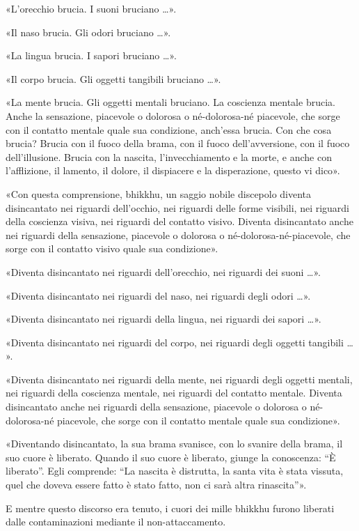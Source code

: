 «L’orecchio brucia. I suoni bruciano …​».


«Il naso brucia. Gli odori bruciano …​».


«La lingua brucia. I sapori bruciano …​».


«Il corpo brucia. Gli oggetti tangibili bruciano …​».


«La mente brucia. Gli oggetti mentali bruciano. La coscienza mentale
brucia. Anche la sensazione, piacevole o dolorosa o né-dolorosa-né
piacevole, che sorge con il contatto mentale quale sua condizione,
anch’essa brucia. Con che cosa brucia? Brucia con il fuoco della brama,
con il fuoco dell’avversione, con il fuoco dell’illusione. Brucia con la
nascita, l’invecchiamento e la morte, e anche con l’afflizione, il
lamento, il dolore, il dispiacere e la disperazione, questo vi dico».


«Con questa comprensione, bhikkhu, un saggio nobile discepolo diventa
disincantato nei riguardi dell’occhio, nei riguardi delle forme
visibili, nei riguardi della coscienza visiva, nei riguardi del contatto
visivo. Diventa disincantato anche nei riguardi della sensazione,
piacevole o dolorosa o né-dolorosa-né-piacevole, che sorge con il
contatto visivo quale sua condizione».


«Diventa disincantato nei riguardi dell’orecchio, nei riguardi dei suoni
…​».


«Diventa disincantato nei riguardi del naso, nei riguardi degli odori
…​».


«Diventa disincantato nei riguardi della lingua, nei riguardi dei sapori
…​».


«Diventa disincantato nei riguardi del corpo, nei riguardi degli oggetti
tangibili …​».


«Diventa disincantato nei riguardi della mente, nei riguardi degli
oggetti mentali, nei riguardi della coscienza mentale, nei riguardi del
contatto mentale. Diventa disincantato anche nei riguardi della
sensazione, piacevole o dolorosa o né-dolorosa-né piacevole, che sorge
con il contatto mentale quale sua condizione».


«Diventando disincantato, la sua brama svanisce, con lo svanire della
brama, il suo cuore è liberato. Quando il suo cuore è liberato, giunge
la conoscenza: “È liberato”. Egli comprende: “La nascita è distrutta, la
santa vita è stata vissuta, quel che doveva essere fatto è stato fatto,
non ci sarà altra rinascita”».


E mentre questo discorso era tenuto, i cuori dei mille bhikkhu furono
liberati dalle contaminazioni mediante il non-attaccamento.


